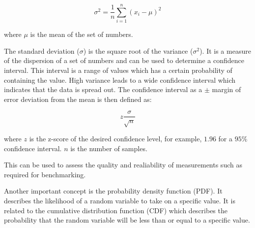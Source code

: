 \begin{equation}
  \label{eqn:variance}
  \sigma^2 = \frac{1}{n} \sum_{i=1}^{n} (x_i - \mu)^2
\end{equation}

where $\mu$ is the mean of the set of numbers.

The standard deviation ($\sigma$) is the square root of the variance ($\sigma^2$). It is a measure of the dispersion of a set of numbers and can be used to determine a confidence interval. This interval is a range of values which has a certain probability of containing the value. High variance leads to a wide confidence interval which indicates that the data is spread out. The confidence interval as a $\pm$ margin of error deviation from the mean is then defined as:

\begin{equation}
  \label{eqn:confidence-interval}
  z \frac{\sigma}{\sqrt{n}}
\end{equation}

where $z$ is the z-score of the desired confidence level, for example, $1.96$ for a $95\%$ confidence interval. $n$ is the number of samples.

This can be used to assess the quality and realiability of measurements such as required for benchmarking.

Another important concept is the probability density function (\gls{PDF}). It describes the likelihood of a random variable to take on a specific value. It is related to the cumulative distribution function (\gls{CDF}) which describes the probability that the random variable will be less than or equal to a specific value.

